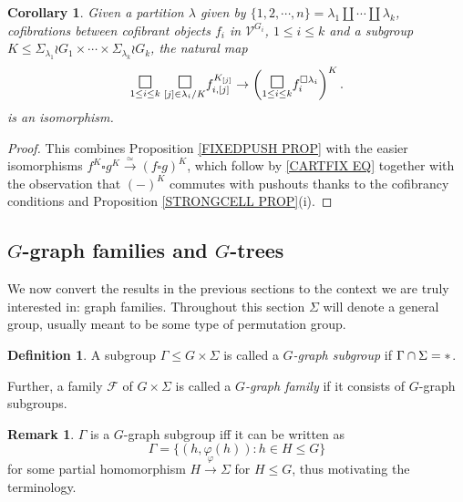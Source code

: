 \documentclass[a4paper,10pt
,draft
]{article}%
\numberwithin{equation}{section}
\numberwithin{figure}{section}
\newtheorem{corollary}[equation]{Corollary}%
\theoremstyle{definition} %
\newtheorem{definition}[equation]{Definition}%
\newtheorem{remark}[equation]{Remark}%
\newcommand{\1}{\ensuremath{\mathbbm 1}}%
\begin{document}
\begin{corollary}\label{FIXEDPUSH COR}
	Given a partition $\lambda$ given by
	$\{1,2,\cdots,n\} = \lambda_1 \amalg \cdots \amalg \lambda_k$, cofibrations between cofibrant objects $f_i$ in $\mathcal{V}^{G_i}$, $1\leq i \leq k$ and a subgroup
	$K \leq 
	\Sigma_{\lambda_1} \wr G_1
	\times \cdots \times
	\Sigma_{\lambda_k} \wr G_k
	$,
	the natural map
\[
	\underset{1\leq i\leq k}{\mathlarger{\mathlarger{\square}}}
	\phantom{|}
	\underset{[j] \in \lambda_i/K}{\mathlarger{\mathlarger{\square}}}
	f_{i, [j]}^{K_{[j]}}
\to
	\left( 	\underset{1\leq i\leq k}{\mathlarger{\mathlarger{\square}}}f_i^{\square \lambda_i} \right)^K.
\]
is an isomorphism.
\end{corollary}

\begin{proof}
This combines Proposition \ref{FIXEDPUSH PROP}
with the easier isomorphisms
$f^K \square g^K \xrightarrow{\simeq} 
(f \square g)^K$,
which follow by \eqref{CARTFIX EQ}
together with the observation that $(\minus)^K$
commutes with pushouts thanks to the cofibrancy conditions and Proposition \ref{STRONGCELL PROP}(i).
\end{proof}



\subsection{$G$-graph families and $G$-trees}
\label{G_GRAPH_SECTION}



We now convert the results in the previous sections to the context we are truly interested in:
graph families. 
Throughout this section $\Sigma$ will denote a general group,
usually meant to be some type of permutation group.


\begin{definition}
        \label{GRAPH DEF}
A subgroup $\Gamma \leq G \times \Sigma$ is called a
\textit{$G$-graph subgroup} if $\Gamma \cap \Sigma = \**$. 

Further, a family $\mathcal{F}$ of $G \times \Sigma$ is called a \textit{$G$-graph family} if it consists of $G$-graph subgroups.
\end{definition}

\begin{remark}\label{GRAPH REM}
$\Gamma$ is a $G$-graph subgroup iff it can be written as
\[
	\Gamma = 
	\{
	(h,\varphi(h)) : h \in H \leq G
	\}
\]
for some partial homomorphism $H \xrightarrow{\varphi} \Sigma$
for $H \leq G$, 
thus motivating the terminology.
\end{remark}
\end{document}
